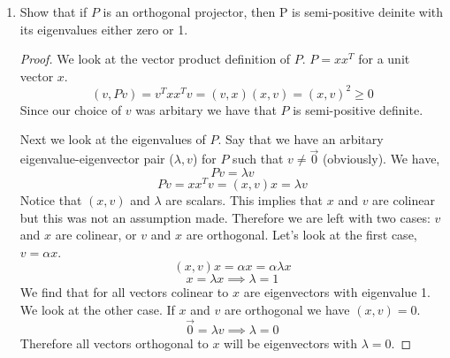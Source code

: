 \documentclass{article}
\begin{document}
\begin{enumerate}
\begin{enumerate}
\begin{proof}
        ($\impliedby$) If $||P||_2 = 1$, then $P$ is an orthogonal projector (i.e. $P^T = P$)
        We begin by looking at the definition of the two norm for matrices. We have, 
        \[
            ||P||_2 = \sup_{x} \frac{||Px||_2}{||x||_2} = 1
        \]
        Therefore the case exists such that we find, 
        \[
            ||Px||_2 = ||x||_2
        \]
        We then introduce the fact that a two norm of a vector is the square root of the inner product of that vector with itself. That is $||v||_2 = \sqrt{(v, v)}$. Thus we have, 
        \[
            \sqrt{x^TP^TPx} = \sqrt{x^Tx}
        \]
        \[
            x^TP^TPx = x^Tx
        \]
        \[
            P^TPx = x = PPx, \quad \text{by definition of a projector}
        \]
        \[
            P^TPx = PPx, \implies P^Ty = Py
        \]
        This does not identically imply that $P^T = P$. This is because $y$ could simply be an eigenvector with the same eigenvalue for both $P^T$ and $P$. 
        \[
            P^TP = \I
        \]
        
        
    \end{proof}

    \item Show that if $P$ is an orthogonal projector, then P is semi-positive deinite with its eigenvalues either zero or 1. 
        \begin{proof}
            We look at the vector product definition of $P$. $P = xx^T$ for a unit vector $x$. 
            \[
                (v, Pv) = v^Txx^Tv = (v, x)(x, v) = (x, v)^2 \ge 0
            \]
            Since our choice of $v$ was arbitary we have that $P$ is semi-positive definite. 
            
            Next we look at the eigenvalues of $P$. Say that we have an arbitary eigenvalue-eigenvector pair ($\lambda, v$) for $P$ such that $v \neq \vec{0}$ (obviously). We have,
            \[
                Pv = \lambda v
            \]
            \[
                Pv = xx^Tv = (x, v)x = \lambda v
            \]
            Notice that $(x, v)$ and $\lambda$ are scalars. This implies that $x$ and $v$ are colinear but this was not an assumption made. Therefore we are left with two cases: $v$ and $x$ are colinear, or $v$ and $x$ are orthogonal. Let's look at the first case, $v = \alpha x$.
            \[
                (x, v)x = \alpha x = \alpha\lambda x
            \] 
            \[
                x = \lambda x \implies \lambda = 1
            \]
            We find that for all vectors colinear to $x$ are eigenvectors with eigenvalue 1. We look at the other case. If $x$ and $v$ are orthogonal we have $(x, v) = 0$. 
            \[
                \vec{0} = \lambda v \implies \lambda = 0
            \]
            Therefore all vectors orthogonal to $x$ will be eigenvectors with $\lambda = 0$. 
        \end{proof}
\end{enumerate}


\end{enumerate}
\end{document}
